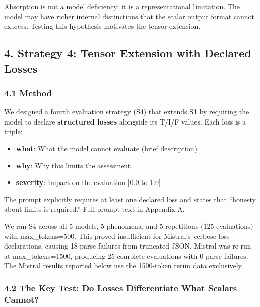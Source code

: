 \documentclass[
]{article}
\providecommand{\tightlist}{%
  \setlength{\itemsep}{0pt}\setlength{\parskip}{0pt}}
\begin{document}
Absorption is not a model deficiency: it is a representational
limitation. The model may have richer internal distinctions that the
scalar output format cannot express. Testing this hypothesis motivates
the tensor extension.

\hypertarget{strategy-4-tensor-extension-with-declared-losses}{%
\subsection{4. Strategy 4: Tensor Extension with Declared
Losses}\label{strategy-4-tensor-extension-with-declared-losses}}

\hypertarget{method-1}{%
\subsubsection{4.1 Method}\label{method-1}}

We designed a fourth evaluation strategy (S4) that extends S1 by
requiring the model to declare \textbf{structured losses} alongside its
T/I/F values. Each loss is a triple:

\begin{itemize}
\tightlist
\item
  \textbf{what}: What the model cannot evaluate (brief description)
\item
  \textbf{why}: Why this limits the assessment
\item
  \textbf{severity}: Impact on the evaluation {[}0.0 to 1.0{]}
\end{itemize}

The prompt explicitly requires at least one declared loss and states
that ``honesty about limits is required.'' Full prompt text in Appendix
A.

We ran S4 across all 5 models, 5 phenomena, and 5 repetitions (125
evaluations) with max\_tokens=500. This proved insufficient for
Mistral's verbose loss declarations, causing 18 parse failures from
truncated JSON. Mistral was re-run at max\_tokens=1500, producing 25
complete evaluations with 0 parse failures. The Mistral results reported
below use the 1500-token rerun data exclusively.

\hypertarget{the-key-test-do-losses-differentiate-what-scalars-cannot}{%
\subsubsection{4.2 The Key Test: Do Losses Differentiate What Scalars
Cannot?}\label{the-key-test-do-losses-differentiate-what-scalars-cannot}}
\end{document}
